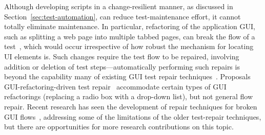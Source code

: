 Although developing scripts in a change-resilient manner, as discussed in
Section~\ref{sec:test-automation}, can reduce test-maintenance effort, it cannot
totally eliminate maintenance. In particular, refactoring of the application
GUI, such as splitting a web page into multiple tabbed pages, can break the flow
of a test~\cite{thummalapenta:2013a}, which would occur irrespective of how
robust the mechanism for locating UI elements is. Such changes require the test
flow to be repaired, involving addition or deletion of test
steps---automatically performing such repairs is beyond the capability many of
existing GUI test repair techniques~\cite{Choudhary:2011, Grechanik:2009,
  Memon:2008}. Proposals GUI-refactoring-driven test repair~\cite{Daniel2011}
accommodate certain types of GUI refactorings (\eg replacing a radio box with a
drop-down list), but not general flow repair.  Recent research has seen the
development of repair techniques for broken GUI flows~\cite{Zhang2013},
addressing some of the limitations of the older test-repair techniques, but
there are opportunities for more research contributions on this topic.




